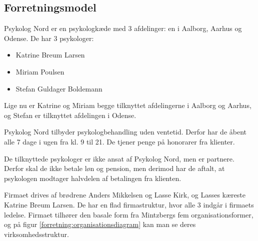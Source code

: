 \subsection{Forretningsmodel}
Psykolog Nord er en psykologkæde med 3 afdelinger: en i Aalborg, Aarhus og Odense. De har 3 psykologer:

\begin{itemize}
    \item Katrine Breum Larsen
    \item Miriam Poulsen
    \item Stefan Guldager Boldemann
\end{itemize}

Lige nu er Katrine og Miriam begge tilknyttet afdelingerne i Aalborg og Aarhus, og Stefan er tilknyttet afdelingen i Odense.

Psykolog Nord tilbyder psykologbehandling uden ventetid.
Derfor har de åbent alle 7 dage i ugen fra kl. 9 til 21. De tjener penge på honorarer fra klienter.

De tilknyttede psykologer er ikke ansat af Psykolog Nord, men er partnere.
Derfor skal de ikke betale løn og pension, men derimod har de aftalt, at psykologen modtager halvdelen af betalingen fra klienten.

Firmaet drives af brødrene Anders Mikkelsen og Lasse Kirk, og Lasses kæreste Katrine Breum Larsen.
De har en flad firmastruktur, hvor alle 3 indgår i firmaets ledelse. 
Firmaet tilhører den basale form fra Mintzbergs fem organisationsformer, og på figur \ref{forretning:organisationsdiagram} kan man se deres virksomhedsstruktur.
